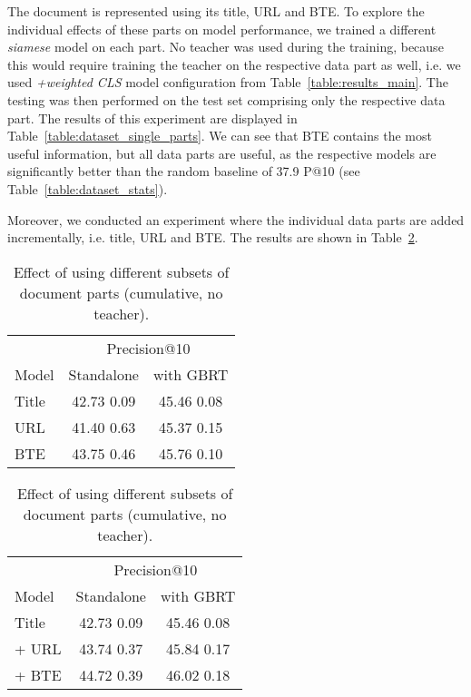 \documentclass[letterpaper]{article} \usepackage{aaai22 }  \usepackage{times}  \usepackage{helvet}  \usepackage{courier}  \usepackage[hyphens]{url}  \usepackage{graphicx} \usepackage{amsmath,amsfonts,amssymb, mathabx,bm,bbm}
\begin{document}
The document is represented using its title, URL and BTE. To explore the individual effects of these parts on model performance, we trained a different \textit{siamese} model on each part. No teacher was used during the training, because this would require training the teacher on the respective data part as well, i.e. we used \textit{+weighted CLS} model configuration from Table~\ref{table:results_main}. The testing was then performed on the test set comprising only the respective data part. The results of this experiment are displayed in Table~\ref{table:dataset_single_parts}. We can see that BTE contains the most useful information, but all data parts are useful, as the respective models are significantly better than the random baseline of 37.9 P@10 (see Table~\ref{table:dataset_stats}). 

Moreover, we conducted an experiment where the individual data parts are added incrementally, i.e. title, URL and BTE. The results are shown in Table~\ref{table:dataset_additive_parts}.

\begin{table}[!htb]
    \centering\footnotesize
    \begin{tabular}{lcc}\toprule
    & \multicolumn{2}{c}{Precision@10}\\
    Model & Standalone & with GBRT \\\midrule
    Title & 42.73  0.09 & 45.46  0.08\\
URL & 41.40  0.63 & 45.37  0.15 \\
BTE & 43.75  0.46 & 45.76  0.10 \\\bottomrule
\end{tabular}
    \caption{Effect of using only a single data part (no teacher).}
    \label{table:dataset_single_parts}
    
    \vspace{0.5cm}
    \begin{tabular}{lcc}\toprule
    & \multicolumn{2}{c}{Precision@10}\\
    Model & Standalone & with GBRT \\\midrule
    Title & 42.73  0.09 & 45.46  0.08\\
     + URL & 43.74  0.37 & 45.84   0.17 \\
     + BTE & 44.72  0.39  & 46.02  0.18 \\\bottomrule
\end{tabular}
    \caption{Effect of using different subsets of document parts (cumulative, no teacher).}
    \label{table:dataset_additive_parts}

\end{table}
\end{document}
